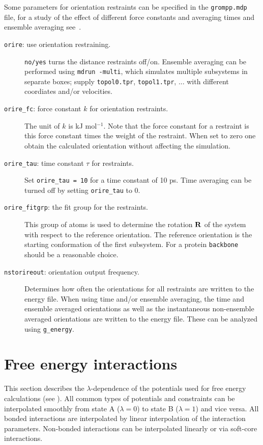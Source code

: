 Some parameters for orientation restraints can be specified in the
{\tt grompp.mdp} file, for a study of the effect of different
force constants and averaging times and ensemble averaging see~\cite{Hess2003}.
\begin{description}
\item[{\tt orire}: use orientation restraining.]
        {\tt no/yes} turns the distance restraints off/on.
	Ensemble averaging can be performed using {\tt mdrun -multi},
	which simulates multiple subsystems in separate boxes;
	supply {\tt topol0.tpr}, {\tt topol1.tpr}, ... with different
	coordiates and/or velocities.
\item[{\tt orire\_fc}: force constant $k$ for orientation restraints.] 
	The unit of $k$ is kJ mol$^{-1}$.
	Note that the force constant for a restraint is this force constant
	times the weight of the restraint.
	When set to zero one obtain the calculated orientation without
	affecting the simulation.
\item[{\tt orire\_tau}: time constant $\tau$ for restraints.] 
        Set {\tt orire\_tau = 10} for a time constant of
        10 ps. Time averaging can be turned off by setting {\tt orire\_tau}
        to 0.
\item[{\tt orire\_fitgrp}: the fit group for the restraints.]
	This group of atoms is used to determine the rotation ${\mathbf R}$
	of the system with respect to the reference orientation.
	The reference orientation is the starting conformation of
	the first subsystem. For a protein {\tt backbone} should be
        a reasonable choice.	
\item[{\tt nstorireout}: orientation output frequency.]
        Determines how often the orientations for all restraints
        are written to the energy file.
	When using time and/or ensemble averaging, the time and ensemble
	averaged orientations as well as the instantaneous non-ensemble
	averaged orientations are written to the energy file.
	These can be analyzed using {\tt g\_energy}.
\end{description}


\section{Free energy interactions}
\label{sec:feia}
\newcommand{\LAM}{\lambda}
\newcommand{\LL}{(1-\LAM)}
\newcommand{\dvdl}[1]{\frac{\partial #1}{\partial \LAM}}
This section describes the $\lambda$-dependence of the potentials
used for free energy calculations (see ).
All common types of potentials and constraints can be
interpolated smoothly from state A ($\lambda=0$) to state B
($\lambda=1$) and vice versa.
All bonded interactions are interpolated by linear interpolation
of the interaction parameters. Non-bonded interactions can be
interpolated linearly or via soft-core interactions.


